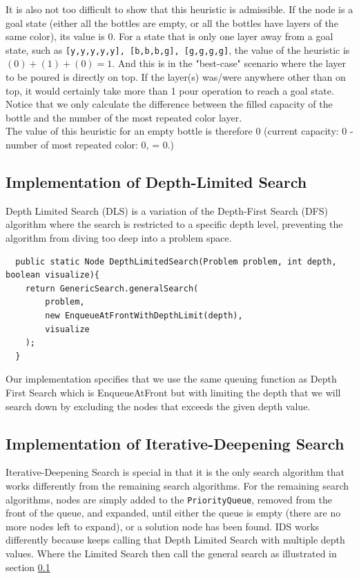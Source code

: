 \documentclass{article}
\begin{document}
It is also not too difficult to show that this heuristic is admissible. If the node is a goal state (either all the bottles are empty, or all the bottles have layers of the same color), its value is 0. For a state that is only one layer away from a goal state, such as \texttt{[y,y,y,y,y], [b,b,b,g], [g,g,g,g]}, the value of the heuristic is $(0) + (1) + (0) = 1$. And this is in the "best-case" scenario where the layer to be poured is directly on top. If the layer(s) was/were anywhere other than on top, it would certainly take more than 1 pour operation to reach a goal state. Notice that we only calculate the difference between the filled capacity of the bottle and the number of the most repeated color layer. \\

The value of this heuristic for an empty bottle is therefore 0 (current capacity: 0 - number of most repeated color: 0, = 0.)

\subsection{Implementation of Depth-Limited Search}\label{DLS}

 Depth Limited Search (DLS) is a variation of the Depth-First Search (DFS) algorithm where the search is restricted to a specific depth level, preventing the algorithm from diving too deep into a problem space.

\begin{verbatim}
  public static Node DepthLimitedSearch(Problem problem, int depth, boolean visualize){
    return GenericSearch.generalSearch(
        problem,
        new EnqueueAtFrontWithDepthLimit(depth),
        visualize
    );
  }
\end{verbatim}


Our implementation specifies that we use the same queuing function as Depth First Search which is EnqueueAtFront but with limiting the depth that we will search down by excluding the nodes that exceeds the given depth value.


\subsection{Implementation of Iterative-Deepening Search}

Iterative-Deepening Search is special in that it is the only search algorithm that works differently from the remaining search algorithms. For the remaining search algorithms, nodes are simply added to the \texttt{PriorityQueue}, removed from the front of the queue, and expanded, until either the queue is empty (there are no more nodes left to expand), or a solution node has been found. IDS works differently because keeps calling that Depth Limited Search with multiple depth values. Where the Limited Search then call the general search as illustrated in section \ref{DLS}
\end{document}
